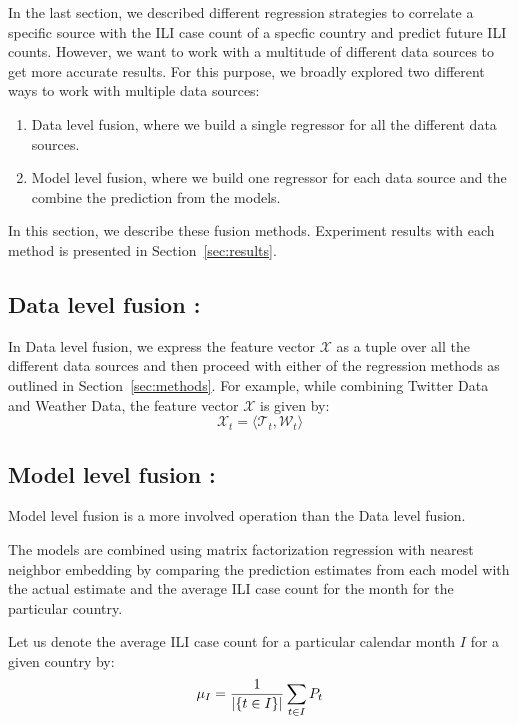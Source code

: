 
In the last section, we described different regression strategies to correlate
a specific source with the ILI case count of a specfic country and predict
future ILI counts. However, we want to work with a multitude of different data
sources to get more accurate results. For this purpose, we broadly explored two
different ways to work with multiple data sources:

\begin{enumerate}
  \item Data level fusion, where we build a single regressor for all the different data
    sources.
  \item Model level fusion, where we build one regressor for each data source and 
    the combine the prediction from the models.
\end{enumerate}

In this section, we describe these fusion methods. Experiment results with each method is presented in Section~\ref{sec:results}.

\subsection{\label{sec:fusion:data} Data level fusion :}
In Data level fusion, we express the feature vector $\mathcal{X}$ as a tuple over all the different data 
sources and then proceed with either of the regression methods as outlined in Section~\ref{sec:methods}.
For example, while combining Twitter Data and Weather Data, the feature vector $\mathcal{X}$ is given 
by:
\[\mathcal{X}_t = \langle \mathcal{T}_t, \mathcal{W}_t \rangle
\]

\subsection{\label{sec:fusion:model} Model level fusion :}
Model level fusion is a more involved operation than the Data level fusion. 

The models are combined using matrix factorization regression with 
nearest neighbor embedding by comparing the
prediction estimates from each model with the actual estimate and the average
ILI case count for the month for the particular country.

Let us denote the average ILI case count for a particular calendar 
month $I$ for a given country by:
\begin{equation*}
  \mu_I = {1 \over {|\lbrace t \in I\rbrace|}} \sum_{t \in I}P_{t}
\end{equation*}

